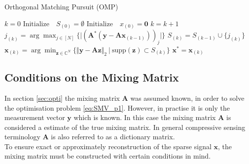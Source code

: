 \begin{algorithm}[H]
\caption{Orthogonal Matching Pursuit (OMP)}
\begin{algorithmic}[1]
			\State$k = 0$			
			\State$\text{Initialize} \quad S_{(0)} =\emptyset$ 
			\State$\text{Initialize} \quad x_{(0)} =\mathbf{0}$
                \State$k = k + 1$
				\State$j_{(k)} = \arg \max_{j \in [N]} \lbrace \vert (\mathbf{A}^\ast (\mathbf{y} - \mathbf{Ax}_{(k-1)}))_j \vert \rbrace$				
				\State$S_{(k)} = S_{(k-1)} \cup \lbrace j_{(k)} \rbrace$ 
				\State$\mathbf{x}_{(k)} = \arg \min_{\mathbf{z} \in \mathbb{C}^N} \lbrace \Vert \mathbf{y} - \mathbf{Az} \Vert_2 \  \vert \ \text{supp}(\mathbf{z}) \subset S_{(k)} \rbrace$
          		\EndWhile
          		\State$\mathbf{x}^\ast = \mathbf{x}_{(k)}$
            \EndProcedure
        \end{algorithmic} 
        \label{alg:OMP}
\end{algorithm}

\subsection{Conditions on the Mixing Matrix}\label{sec:dic_conditions}
In section \ref{sec:opti} the mixing matrix $\mathbf{A}$ was assumed known, in order to solve the optimisation problem \eqref{eq:SMV_p1}. 
However, in practise it is only the measurement vector $\mathbf{y}$ which is known. 
In this case the mixing matrix $\mathbf{A}$ is considered a estimate of the true mixing matrix. 
In general compressive sensing terminology $\mathbf{A}$ is also referred to as a dictionary matrix.
\\
To ensure exact or approximately reconstruction of the sparse signal $\mathbf{x}$, the mixing matrix must be constructed with certain conditions in mind. 


